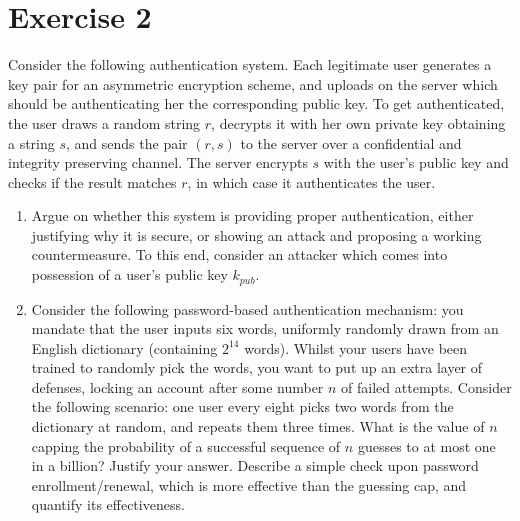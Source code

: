 \section{Exercise 2}

Consider the following authentication system. 
Each legitimate user generates a key pair for an asymmetric encryption scheme, and uploads on the server which should be authenticating her the corresponding public key. 
To get authenticated, the user draws a random string $r$, decrypts it with her own private key obtaining a string $s$, and sends the pair $(r,s)$ to the server over a confidential and integrity preserving channel. 
The server encrypts $s$ with the user's public key and checks if the result matches $r$, in which case it authenticates the user.
\begin{enumerate}
    \item Argue on whether this system is providing proper authentication, either justifying why it is secure, or showing an attack and proposing a working countermeasure. 
        To this end, consider an attacker which comes into possession of a user's public key $k_{pub}$.
    \item Consider the following password-based authentication mechanism: you mandate that the user inputs six words, uniformly randomly drawn from an English dictionary (containing $2^{14}$ words).
        Whilst your users have been trained to randomly pick the words, you want to put up an extra layer of defenses, locking an account after some number $n$ of failed attempts.
        Consider the following scenario: one user every eight picks two words from the dictionary at random, and repeats them three times.
        What is the value of $n$ capping the probability of a successful sequence of $n$ guesses to at most one in a billion? 
        Justify your answer.
        Describe a simple check upon password enrollment/renewal, which is more effective than the guessing cap, and quantify its effectiveness.
\end{enumerate}

